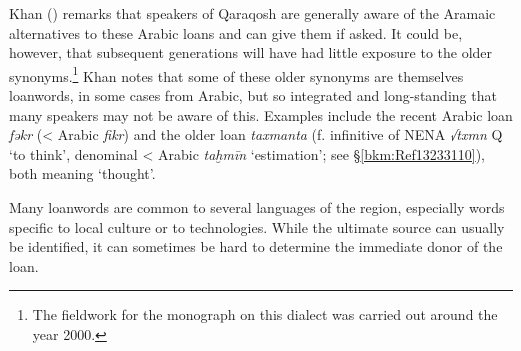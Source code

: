\documentclass[output=paper]{langsci/langscibook}
\begin{document}
Khan (\citeyear[516]{Khan2002}) remarks that speakers of  Qaraqosh are generally aware of the Aramaic alternatives to these Arabic loans and can give them if asked. It could be, however, that subsequent generations will have had little exposure to the older synonyms.\footnote{The fieldwork for the monograph on this dialect was carried out around the year 2000.} Khan notes that some of these older synonyms are themselves {loanwords}, in some cases from Arabic, but so integrated and long-standing that many speakers may not be aware of this. Examples include the recent Arabic loan \textit{fəkr} (< Arabic \textit{fikr}) and the older loan \textit{taxmanta} (f. {infinitive} of NENA \textit{√txmn} Q ‘to think’, denominal < Arabic \textit{taḫmīn} ‘estimation’; see §\ref{bkm:Ref13233110}), both meaning ‘thought’.

Many {loanwords} are common to several languages of the region, especially words specific to local culture or to technologies. While the ultimate source can usually be identified, it can sometimes be hard to determine the immediate donor of the loan. 
\end{document}

